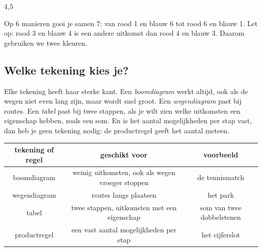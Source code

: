 \begin{alleenvoor}{4,5}
{{\begin{minipage}{8.6cm}
\vspace{1mm}
Op 6 manieren gooi je samen 7: van rood 1 en blauw 6 tot rood 6 en blauw 1. Let op: rood 3 en blauw 4 is een andere uitkomst dan rood 4 en blauw 3. Daarom gebruiken we twee kleuren.
\end{minipage}}{}}

\begin{oefeningen}
\end{oefeningen}

\subsection{Welke tekening kies je?}

Elke tekening heeft haar sterke kant. Een \textit{boomdiagram} werkt altijd, ook als de wegen niet even lang zijn, maar wordt snel groot. Een \textit{wegendiagram} past bij routes. Een \textit{tabel} past bij twee stappen, als je wilt zien welke uitkomsten een eigenschap hebben, zoals een som. En is het aantal mogelijkheden per stap vast, dan heb je geen tekening nodig: de productregel geeft het aantal meteen.

{\centering\renewcommand{\arraystretch}{1.4}\small\begin{tabular}{|c|c|c|}
\hline
\textbf{tekening of regel} & \textbf{geschikt voor} & \textbf{voorbeeld} \\ \hline
boomdiagram & weinig uitkomsten, ook als wegen vroeger stoppen & de tennismatch \\ \hline
wegendiagram & routes langs plaatsen & het park \\ \hline
tabel & twee stappen, uitkomsten met een eigenschap & som van twee dobbelstenen \\ \hline
productregel & een vast aantal mogelijkheden per stap & het cijferslot \\ \hline
\end{tabular}\par}

\medskip
\end{alleenvoor}
